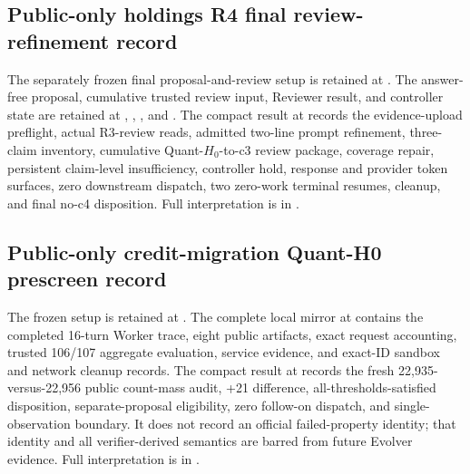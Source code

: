 \subsection{Public-only holdings R4 final review-refinement record}

The separately frozen final proposal-and-review setup is retained at
.
The answer-free proposal, cumulative trusted review input, Reviewer result, and
controller state are retained at
,
,
,
and
.
The compact result at
records the evidence-upload preflight, actual R3-review reads, admitted two-line
prompt refinement, three-claim inventory, cumulative Quant-$H_0$-to-c3 review
package, coverage repair, persistent claim-level insufficiency, controller
hold, response and provider token surfaces, zero downstream dispatch, two
zero-work terminal resumes, cleanup, and final no-c4 disposition. Full
interpretation is in
.

\subsection{Public-only credit-migration Quant-H0 prescreen record}

The frozen setup is retained at
. The
complete local mirror at
contains the completed 16-turn Worker trace, eight public artifacts, exact
request accounting, trusted 106/107 aggregate evaluation, service evidence,
and exact-ID sandbox and network cleanup records. The compact result at
records the fresh 22,935-versus-22,956 public count-mass audit, +21 difference,
all-thresholds-satisfied disposition, separate-proposal eligibility, zero
follow-on dispatch, and single-observation boundary. It does not record an
official failed-property identity; that identity and all verifier-derived
semantics are barred from future Evolver evidence. Full interpretation is in
.

